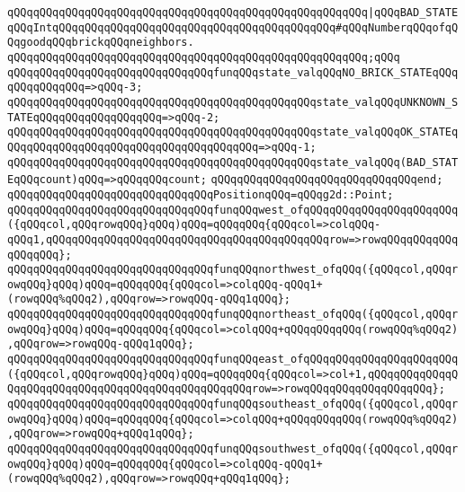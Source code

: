 \verb|qQQqqQQqqQQqqQQqqQQqqQQqqQQqqQQqqQQqqQQqqQQqqQQqqQQqqQQq|\verb#|qQQqBAD_STATEqQQqIntqQQqqQQqqQQqqQQqqQQqqQQqqQQqqQQqqQQqqQQqqQQq#\verb|#qQQqNumberqQQqofqQQqgoodqQQqbrickqQQqneighbors.|\newline
\verb|qQQqqQQqqQQqqQQqqQQqqQQqqQQqqQQqqQQqqQQqqQQqqQQqqQQqqQQq;qQQq|\newline
\newline
\verb|qQQqqQQqqQQqqQQqqQQqqQQqqQQqqQQqfunqQQqstate_valqQQqNO_BRICK_STATEqQQqqQQqqQQqqQQq=>qQQq-3;|\newline
\verb|qQQqqQQqqQQqqQQqqQQqqQQqqQQqqQQqqQQqqQQqqQQqqQQqstate_valqQQqUNKNOWN_STATEqQQqqQQqqQQqqQQqqQQq=>qQQq-2;|\newline
\verb|qQQqqQQqqQQqqQQqqQQqqQQqqQQqqQQqqQQqqQQqqQQqqQQqstate_valqQQqOK_STATEqQQqqQQqqQQqqQQqqQQqqQQqqQQqqQQqqQQqqQQq=>qQQq-1;|\newline
\verb|qQQqqQQqqQQqqQQqqQQqqQQqqQQqqQQqqQQqqQQqqQQqqQQqstate_valqQQq(BAD_STATEqQQqcount)qQQq=>qQQqqQQqcount;|\newline
\verb|qQQqqQQqqQQqqQQqqQQqqQQqqQQqqQQqend;|\newline
\newline
\verb|qQQqqQQqqQQqqQQqqQQqqQQqqQQqqQQqPositionqQQq=qQQqg2d::Point;|\newline
\newline
\newline
\verb|qQQqqQQqqQQqqQQqqQQqqQQqqQQqqQQqfunqQQqwest_ofqQQqqQQqqQQqqQQqqQQqqQQq({qQQqcol,qQQqrowqQQq}qQQq)qQQq=qQQqqQQq{qQQqcol=>colqQQq-qQQq1,qQQqqQQqqQQqqQQqqQQqqQQqqQQqqQQqqQQqqQQqqQQqrow=>rowqQQqqQQqqQQqqQQqqQQq};|\newline
\verb|qQQqqQQqqQQqqQQqqQQqqQQqqQQqqQQqfunqQQqnorthwest_ofqQQq({qQQqcol,qQQqrowqQQq}qQQq)qQQq=qQQqqQQq{qQQqcol=>colqQQq-qQQq1+(rowqQQq%qQQq2),qQQqrow=>rowqQQq-qQQq1qQQq};|\newline
\verb|qQQqqQQqqQQqqQQqqQQqqQQqqQQqqQQqfunqQQqnortheast_ofqQQq({qQQqcol,qQQqrowqQQq}qQQq)qQQq=qQQqqQQq{qQQqcol=>colqQQq+qQQqqQQqqQQq(rowqQQq%qQQq2),qQQqrow=>rowqQQq-qQQq1qQQq};|\newline
\verb|qQQqqQQqqQQqqQQqqQQqqQQqqQQqqQQqfunqQQqeast_ofqQQqqQQqqQQqqQQqqQQqqQQq({qQQqcol,qQQqrowqQQq}qQQq)qQQq=qQQqqQQq{qQQqcol=>col+1,qQQqqQQqqQQqqQQqqQQqqQQqqQQqqQQqqQQqqQQqqQQqqQQqqQQqrow=>rowqQQqqQQqqQQqqQQqqQQq};|\newline
\verb|qQQqqQQqqQQqqQQqqQQqqQQqqQQqqQQqfunqQQqsoutheast_ofqQQq({qQQqcol,qQQqrowqQQq}qQQq)qQQq=qQQqqQQq{qQQqcol=>colqQQq+qQQqqQQqqQQq(rowqQQq%qQQq2),qQQqrow=>rowqQQq+qQQq1qQQq};|\newline
\verb|qQQqqQQqqQQqqQQqqQQqqQQqqQQqqQQqfunqQQqsouthwest_ofqQQq({qQQqcol,qQQqrowqQQq}qQQq)qQQq=qQQqqQQq{qQQqcol=>colqQQq-qQQq1+(rowqQQq%qQQq2),qQQqrow=>rowqQQq+qQQq1qQQq};|\newline
